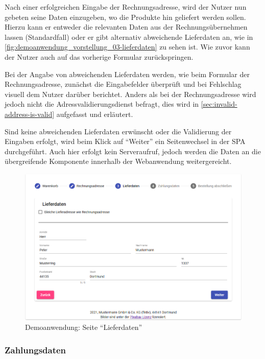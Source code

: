 Nach einer erfolgreichen Eingabe der Rechnungsadresse, wird der Nutzer nun gebeten seine Daten einzugeben, wo die Produkte hin geliefert werden sollen. Hierzu kann er entweder die relevanten Daten aus der Rechnungsübernehmen lassen (Standardfall) oder er gibt alternativ abweichende Lieferdaten an, wie in \autoref{fig:demoanwendung_vorstellung_03-lieferdaten} zu sehen ist. Wie zuvor kann der Nutzer auch auf das vorherige Formular zurückspringen.

Bei der Angabe von abweichenden Lieferdaten werden, wie beim Formular der Rechnungsadresse, zunächst die Eingabefelder überprüft und bei Fehlschlag visuell dem Nutzer darüber berichtet. Anders als bei der Rechnungsadresse wird jedoch nicht die Adressvalidierungsdienst befragt, dies wird in \autoref{sec:invalid-address-is-valid} aufgefasst und erläutert.

Sind keine abweichenden Lieferdaten erwünscht oder die Validierung der Eingaben erfolgt, wird beim Klick auf \enquote{Weiter} ein Seitenwechsel in der SPA durchgeführt. Auch hier erfolgt kein Serveraufruf, jedoch werden die Daten an die übergreifende Komponente innerhalb der Webanwendung weitergereicht.

\begin{figure}[H]
	\centering
	\includegraphics[width=1.00\linewidth]{img/04_erstellung-poc/demoanwendung_vorstellung_03-lieferdaten.png}
	\caption{Demoanwendung: Seite \enquote{Lieferdaten}}
	\label{fig:demoanwendung_vorstellung_03-lieferdaten}
\end{figure}

\subsubsection{Zahlungsdaten}

